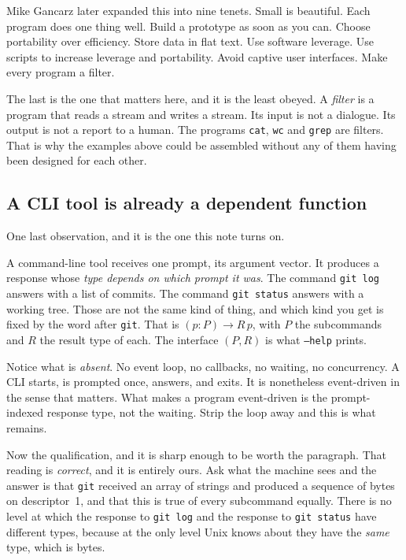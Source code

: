 \documentclass[11pt,a4paper]{article}
\begin{document}
Mike Gancarz later expanded this into nine tenets. Small is beautiful. Each program does one
thing well. Build a prototype as soon as you can. Choose portability over efficiency. Store data in
flat text. Use software leverage. Use scripts to increase leverage and portability. Avoid captive
user interfaces. Make every program a filter.

The last is the one that matters here, and it is the least obeyed. A \emph{filter} is a program
that reads a stream and writes a stream. Its input is not a dialogue. Its output is not a report to
a human. The programs \texttt{cat}, \texttt{wc} and \texttt{grep} are filters. That is why the examples above
could be assembled without any of them having been designed for each other.

\subsection{A CLI tool is already a dependent function}
\label{sec:cli}

One last observation, and it is the one this note turns on.

A command-line tool receives one prompt, its argument vector. It produces a response whose
\emph{type depends on which prompt it was}. The command \texttt{git log} answers with a list of commits. The command \texttt{git status}
answers with a working tree. Those are not the same kind of thing, and which
kind you get is fixed by the word after \texttt{git}. That is $(p : P) \to R\,p$, with $P$ the
subcommands and $R$ the result type of each. The interface $(P, R)$ is what \texttt{--help} prints.

Notice what is \emph{absent}. No event loop, no callbacks, no waiting, no concurrency. A CLI
starts, is prompted once, answers, and exits. It is nonetheless event-driven in the sense that
matters. What makes a program event-driven is the prompt-indexed response type, not the waiting.
Strip the loop away and this is what remains.

Now the qualification, and it is sharp enough to be worth the paragraph. That reading is
\emph{correct}, and it is entirely ours. Ask what the machine sees and the answer is that
\texttt{git} received an array of strings and produced a sequence of bytes on descriptor~1, and
that this is true of every subcommand equally. There is no level at which the response to
\texttt{git log} and the response to \texttt{git status} have different types, because at the only
level Unix knows about they have the \emph{same} type, which is bytes.
\end{document}
